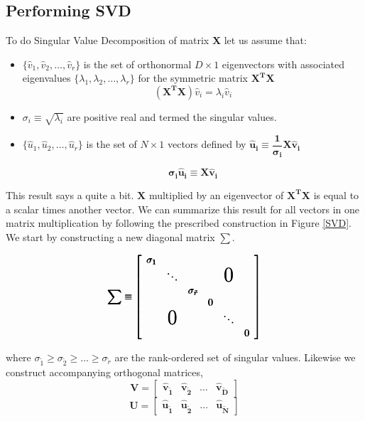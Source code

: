\subsection{Performing SVD}
To do Singular Value Decomposition of matrix \textbf{X} let us assume that:
\begin{itemize}
\item $\{\hat{v} _1,\hat{v} _2, \dots ,\hat{v} _r\}$ is the set of orthonormal $D \times 1$ eigenvectors with associated eigenvalues $\{\lambda _1, \lambda _2, \dots, \lambda _r\}$ for the symmetric matrix $\pmb{X^TX}$
$$(  \pmb{X^TX} ) \hat{v} _i = \lambda _i\hat{v} _i$$

\item
$\sigma_i \equiv \sqrt{\lambda_i}$ are positive real and termed the singular values.

\item 
$\{\hat{u} _1,\hat{u} _2, \dots ,\hat{u} _r\}$ is the set of $N \times 1$ vectors defined by $\pmb{\hat{u}_i \equiv \dfrac{1}{\sigma_i}X\hat{v}_i}$

\begin{equation}
\label{eq3}
\pmb{\sigma_i\hat{u}_i \equiv X\hat{v}_i}
\end{equation}

\end{itemize}

This result says a quite a bit. $\pmb{X}$ multiplied by an eigenvector of $\pmb{X^TX}$ is equal to a scalar times another vector. We can summarize this result for all vectors in one matrix multiplication by following the prescribed construction in Figure \ref{SVD}. We start by constructing a new diagonal matrix $\sum$.

$$\pmb{
\sum \equiv
\left[
    \begin{array}{cccccc}
    \sigma_1                                    \\
    & \ddots & & &\text{\huge0}\\
	& & \sigma_{\tilde{r}} \\
	& & &0 \\
	& \text{\huge0} &  & &\ddots             \\
      &               &   &   &  & 0
    \end{array}
    \right]
    }
$$

where $\sigma_{\tilde{1}} \geq \sigma_{\tilde{2}} \geq  \dots \geq \sigma_{\tilde{r}}$ are the rank-ordered set of singular values. Likewise we construct accompanying orthogonal matrices,
$$\pmb{V} = 
	\left[
	\begin{array}{cccc}
	\pmb{\hat{v}_{\tilde{1}}} &\pmb{\hat{v}_{\tilde{2}}} & \dots &\pmb{\hat{v}_{\tilde{D}}}
	\end{array}
	\right]
$$   
$$ \pmb{U} = 
	\left[
	\begin{array}{cccc}
	\pmb{\hat{u}_{\tilde{1}}} &\pmb{\hat{u}_{\tilde{2}}} & \dots &\pmb{\hat{u}_{\tilde{N}}}
	\end{array}
	\right]
$$   

